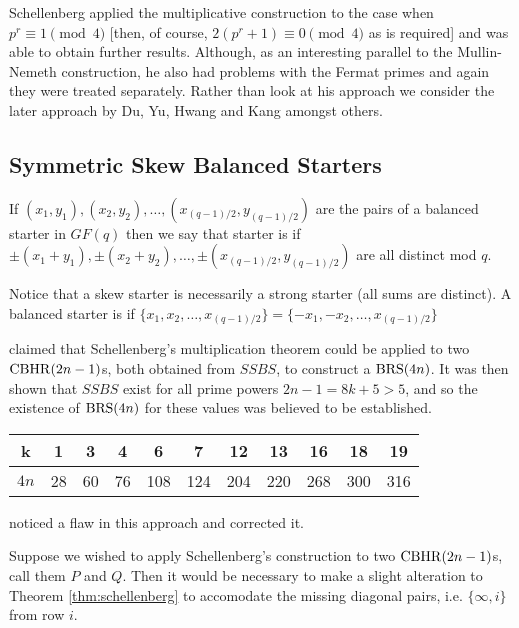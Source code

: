 Schellenberg applied the multiplicative construction to the case when $p^r \equiv 1\pmod 4$ [then, of course, $2(p^r + 1) \equiv 0\pmod 4$ as is required] and was able to obtain further results.
Although, as an interesting parallel to the Mullin-Nemeth construction, he also had problems with the Fermat primes and again they were treated separately.
Rather than look at his approach we consider the later approach by Du, Yu, Hwang and Kang amongst others.

\subsection{Symmetric Skew Balanced Starters}

If $(x_1, y_1), (x_2, y_2),\ldots, (x_{(q - 1)/2}, y_{(q - 1)/2})$ are the pairs of a balanced starter in $GF(q)$ then we say that starter is  if $\pm(x_1 + y_1), \pm(x_2 + y_2),\ldots, \pm(x_{(q - 1)/2}, y_{(q - 1)/2})$ are all distinct mod $q$.

Notice that a skew starter is necessarily a strong starter (all sums are distinct).
A balanced starter is  if $\{x_1, x_2,\ldots, x_{(q - 1)/2}\} = \{-x_1, -x_2,\ldots, x_{(q - 1)/2}\}$

\cite{hwangCompleteBalancedHowell1984} claimed that Schellenberg’s multiplication theorem could be applied to two $\operatorname{CBHR}(2n - 1)$s, both obtained from $SSBS$, to construct a $\operatorname{BRS}(4n)$.
It was then shown that $SSBS$ exist for all prime powers $2n - 1 = 8k + 5 > 5$, and so the existence of $\operatorname{BRS}(4n)$ for these values was believed to be established.

\begin{center}
\begin{tabular}{|c|c|c|c|c|c|c|c|c|c|c|}
\hline
  k  &  1 &  3 &  4 &   6 &   7 &  12 &  13 &  16 &  18 & 19 \\ \hline
$4n$ & 28 & 60 & 76 & 108 & 124 & 204 & 220 & 268 & 300 & 316 \\ \hline
\end{tabular}
\end{center}

\cite{andersonConstructionBalancedRoom1999} noticed a flaw in this approach and corrected it.

Suppose we wished to apply Schellenberg’s construction to two $\operatorname{CBHR}(2n - 1)$s, call them $P$ and $Q$.
Then it would be necessary to make a slight alteration to Theorem \ref{thm:schellenberg} to accomodate the missing diagonal pairs, i.e. $\{\infty, i\}$ from row $i$.

